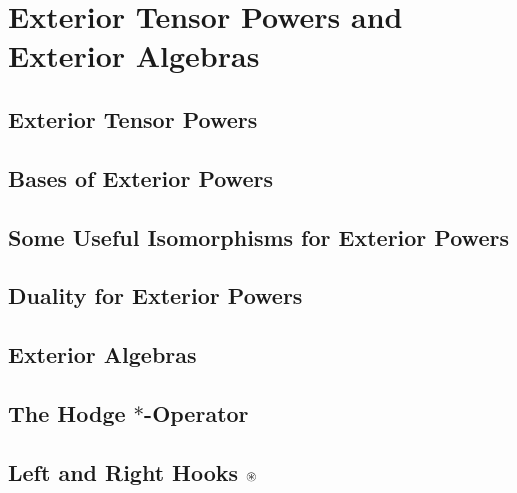 \documentclass[a4paper]{article}
\begin{document}
\newpage
\section{Exterior Tensor Powers and Exterior Algebras}
\subsection{ Exterior Tensor Powers} %

\subsection{ Bases of Exterior Powers} %

\subsection{ Some Useful Isomorphisms for Exterior Powers} %

\subsection{ Duality for Exterior Powers} %

\subsection{ Exterior Algebras} %

\subsection{ The Hodge $*$-Operator} %

\subsection{ Left and Right Hooks $\oast$} %
\end{document}
